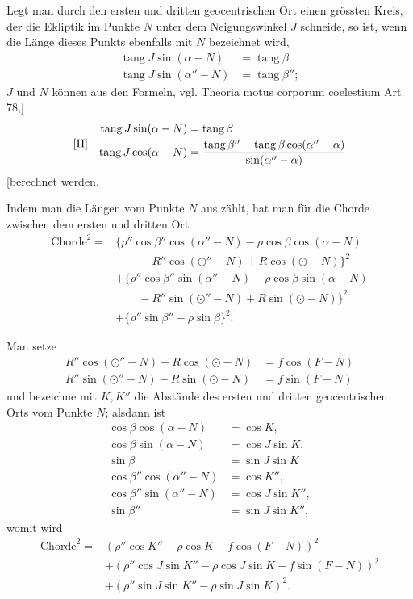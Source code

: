 Legt man durch den ersten und dritten geocentrischen Ort einen grössten Kreis, der die Ekliptik im Punkte \(N\) unter dem Neigungswinkel \(J\) schneide, so ist, wenn die Länge dieses Punkts ebenfalls mit \(N\) bezeichnet wird,
\[
\begin{aligned}
\operatorname{tang}J\sin(\alpha-N)&=\operatorname{tang}\beta\\
\operatorname{tang}J\sin(\alpha''-N)&=\operatorname{tang}\beta'';
\end{aligned}
\]
\(J\) und \(N\) können aus den Formeln, vgl. Theoria motus corporum coelestium Art. 78,]
\[
\begin{array}{l@{\quad}l}
[\mathrm{II}]&\begin{aligned}
\operatorname{tang}J\sin(\alpha-N)&=\operatorname{tang}\beta\\
\operatorname{tang}J\cos(\alpha-N)&=\frac{\operatorname{tang}\beta''-\operatorname{tang}\beta\cos(\alpha''-\alpha)}{\sin(\alpha''-\alpha)}
\end{aligned}
\end{array}
\]
[berechnet werden.

Indem man die Längen vom Punkte \(N\) aus zählt, hat man für die Chorde zwischen dem ersten und dritten Ort
\[
\begin{aligned}
\text{Chorde}^2={}&\bigl\{\rho''\cos\beta''\cos(\alpha''-N)-\rho\cos\beta\cos(\alpha-N)\\
&\qquad{}-R''\cos(\odot''-N)+R\cos(\odot-N)\bigr\}^2\\
&+\bigl\{\rho''\cos\beta''\sin(\alpha''-N)-\rho\cos\beta\sin(\alpha-N)\\
&\qquad{}-R''\sin(\odot''-N)+R\sin(\odot-N)\bigr\}^2\\
&+\{\rho''\sin\beta''-\rho\sin\beta\}^2.
\end{aligned}
\]

Man setze
\[
\begin{aligned}
R''\cos(\odot''-N)-R\cos(\odot-N)&=f\cos(F-N)\\
R''\sin(\odot''-N)-R\sin(\odot-N)&=f\sin(F-N)
\end{aligned}
\]
und bezeichne mit \(K,K''\) die Abstände des ersten und dritten geocentrischen Orts vom Punkte \(N\); alsdann ist
\[
\begin{aligned}
\cos\beta\cos(\alpha-N)&=\cos K,\\
\cos\beta\sin(\alpha-N)&=\cos J\sin K,\\
\sin\beta&=\sin J\sin K\\
\cos\beta''\cos(\alpha''-N)&=\cos K'',\\
\cos\beta''\sin(\alpha''-N)&=\cos J\sin K'',\\
\sin\beta''&=\sin J\sin K'',
\end{aligned}
\]
womit wird
\[
\begin{aligned}
\text{Chorde}^2={}&(\rho''\cos K''-\rho\cos K-f\cos(F-N))^2\\
&+(\rho''\cos J\sin K''-\rho\cos J\sin K-f\sin(F-N))^2\\
&+(\rho''\sin J\sin K''-\rho\sin J\sin K)^2.
\end{aligned}
\]

